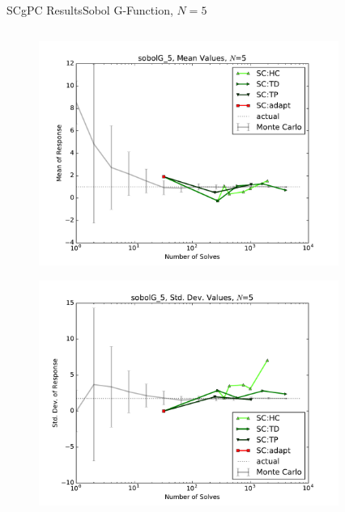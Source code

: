 \documentclass{beamer}
\begin{document}
\begin{frame}{SCgPC Results}{Sobol G-Function, $N=5$}\vspace{-20pt}
 \begin{columns}
   \begin{column}{0.5\textwidth}
        \begin{figure}[h!]
          \centering
          \includegraphics[width=0.8\linewidth]{anlmodels/sobolG_5_mean_vals_nohdmr}
        \end{figure}
        \vspace{-20pt}
        \begin{figure}[h!]
          \centering
          \includegraphics[width=0.8\linewidth]{anlmodels/sobolG_5_var_vals_nohdmr}
        \end{figure}
   \end{column}
   \begin{column}{0.5\textwidth}
        \begin{figure}[h!]
          \centering

\end{figure}
\end{column}
\end{columns}
\end{frame}
\end{document}
